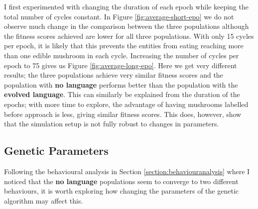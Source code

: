 \documentclass[12pt,a4paper,twoside,openright]{report}
\begin{document}
I first experimented with changing the duration of each epoch while keeping the total number of cycles constant. In Figure \ref{fig:average-short-epo} we do not observe much change in the comparison between the three populations although the fitness scores achieved are lower for all three populations. With only 15 cycles per epoch, it is likely that this prevents the entities from eating reaching more than one edible mushroom in each cycle. Increasing the number of cycles per epoch to 75 gives us Figure \ref{fig:average-long-epo}. Here we get very different results; the three populations achieve very similar fitness scores and the population with {\bf no language} performs better than the population with the {\bf evolved language}. This can similarly be explained from the duration of the epochs; with more time to explore, the advantage of having mushrooms labelled before approach is less, giving similar fitness scores. This does, however, show that the simulation setup is not fully robust to changes in parameters.
 
 \subsection{Genetic Parameters}
 
Following the behavioural analysis in Section \ref{section:behaviouranalysis} where I noticed that the {\bf no language} populations seem to converge to two different behaviours, it is worth exploring how changing the parameters of the genetic algorithm may affect this.
\end{document}
